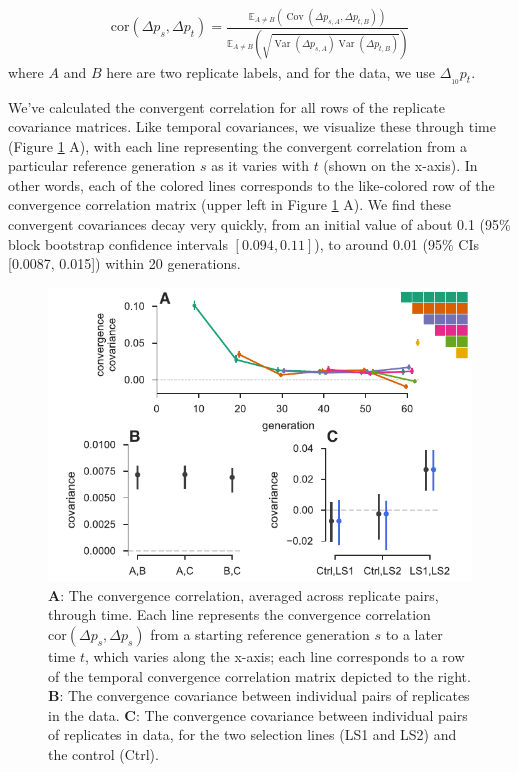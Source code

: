\documentclass[11pt]{article}
\newcommand{\E}{\mathbb{E}}
\DeclareMathOperator{\var}{Var}
\DeclareMathOperator{\cov}{Cov}
\begin{document}
\begin{align}
  \label{eq:conv-corr}
  \mathrm{cor}(\Delta p_s, \Delta p_t) = \frac{\E_{A\ne B} \left( \cov(\Delta p_{s,A}, \Delta p_{t,B}) \right)}{\E_{A\ne B} \left( \sqrt{\var(\Delta p_{s,A}) \var(\Delta p_{t,B})} \right)}
\end{align}
%
where $A$ and $B$ here are two replicate labels, and for the
\textcite{Barghi2019-qy} data, we use $\Delta_{_{10}} p_t$.

We've calculated the convergent correlation for all rows of the replicate
covariance matrices. Like temporal covariances, we visualize these through time
(Figure \ref{fig:figure-2} A), with each line representing the convergent
correlation from a particular reference generation $s$ as it varies with $t$
(shown on the x-axis). In other words, each of the colored lines corresponds to
the like-colored row of the convergence correlation matrix (upper left in
Figure \ref{fig:figure-2} A). We find these convergent covariances decay very
quickly, from an initial value of about 0.1 (95\% block bootstrap confidence
intervals $[0.094, 0.11]$), to around 0.01 (95\% CIs [0.0087, 0.015]) within 20
generations.

\begin{figure}[!htb]
  \centering
  \includegraphics[width=\textwidth]{figures/figure-2.pdf}

  \caption{{\bf A}: The convergence correlation, averaged across replicate
    pairs, through time. Each line represents the convergence correlation
    $\mathrm{cor}(\Delta p_{s}, \Delta p_{s})$ from a starting reference
    generation $s$ to a later time $t$, which varies along the x-axis; each
    line corresponds to a row of the temporal convergence correlation matrix
    depicted to the right.  {\bf B}: The convergence covariance between
    individual pairs of replicates in the \textcite{Kelly2019-dc} data. {\bf
    C}:  The convergence covariance between individual pairs of replicates in
\parencite{Castro2019-uk} data, for the two selection lines  (LS1 and LS2) and
the control (Ctrl).}

  \label{fig:figure-2}
\end{figure}
\end{document}
